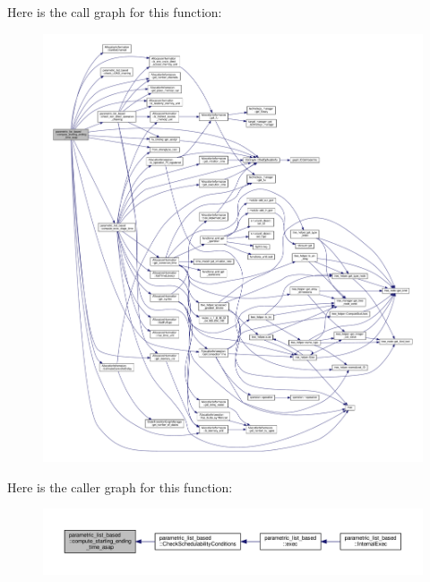 Here is the call graph for this function\+:
\nopagebreak
\begin{figure}[H]
\begin{center}
\leavevmode
\includegraphics[width=350pt]{d7/d47/classparametric__list__based_a02e229e9aa133401c91ddf50fdd78604_cgraph}
\end{center}
\end{figure}
Here is the caller graph for this function\+:
\nopagebreak
\begin{figure}[H]
\begin{center}
\leavevmode
\includegraphics[width=350pt]{d7/d47/classparametric__list__based_a02e229e9aa133401c91ddf50fdd78604_icgraph}
\end{center}
\end{figure}
\mbox{\label{classparametric__list__based_a677ad6063a17ccb5313d608c4009947c}} 
